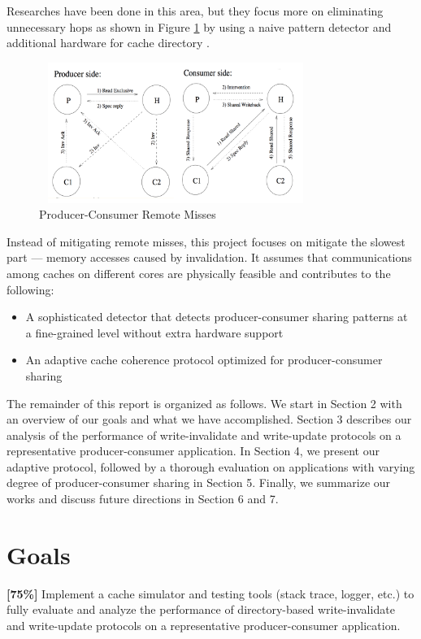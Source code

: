 \documentclass[11pt,conference]{IEEEtran}
\begin{document}
Researches have been done in this area, but they focus more on eliminating unnecessary hops as shown in Figure \ref{write_invalidate_hops} by using a naive pattern detector and additional hardware for cache directory \cite{work1}.
\begin{figure}[!h]
\centering
\captionsetup{justification=centering}
\includegraphics[width=3.5in,height=1.8in]{write_invalidate_hops.png}
\caption{Producer-Consumer Remote Misses}
\label{write_invalidate_hops}
\end{figure}
\FloatBarrier

 Instead of mitigating remote misses, this project focuses on mitigate the slowest part --- memory accesses caused by invalidation. It assumes that communications among caches on different cores are physically feasible and contributes to the following:
\begin{itemize}
  \item A sophisticated detector that detects producer-consumer sharing patterns at a fine-grained level without extra hardware support
  \item An adaptive cache coherence protocol optimized for producer-consumer sharing
\end{itemize}

The remainder of this report is organized as follows. We start in Section 2 with an overview of our goals and what we have accomplished. Section 3 describes our analysis of the performance of write-invalidate and write-update protocols on a representative producer-consumer application. In Section 4, we present our adaptive protocol, followed by a thorough evaluation on applications with varying degree of producer-consumer sharing in Section 5. Finally, we summarize our works and discuss future directions in Section 6 and 7.


\section{Goals}

\textbf{[75\%]} Implement a cache simulator and testing tools (stack trace, logger, etc.) to fully evaluate and analyze the performance of directory-based write-invalidate and write-update protocols on a representative producer-consumer application.
\end{document}
